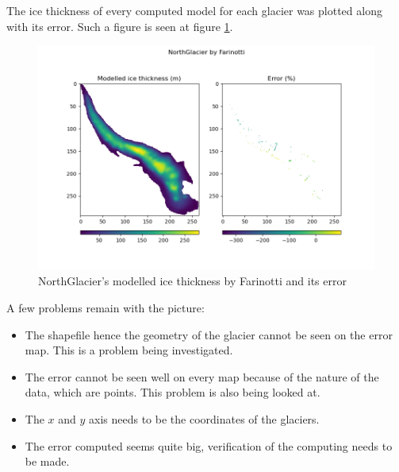 \documentclass[a4, 12pt]{article}
\begin{document}
The ice thickness of every computed model for each glacier was plotted along with its error. Such a figure is seen at figure \ref{fig:ng_error}.
\begin{figure}[h!]
	\centering
	\includegraphics[scale=0.5]{../comparison_images/NorthGlacier_Farinotti_error.png}
	\caption{NorthGlacier's modelled ice thickness by Farinotti and its error}
	\label{fig:ng_error}
\end{figure}
A few problems remain with the picture:
\begin{itemize}
\item The shapefile hence the geometry of the glacier cannot be seen on the error map. This is a problem being investigated.
\item The error cannot be seen well on every map because of the nature of the data, which are points. This problem is also being looked at.
\item The $x$ and $y$ axis needs to be the coordinates of the glaciers.
\item The error computed seems quite big, verification of the computing needs to be made.
\end{itemize}
\end{document}
